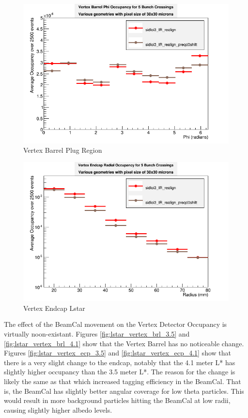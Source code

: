 \documentclass{report}
\begin{document}
                \begin{figure}[H] 
                    \includegraphics[width=\textwidth]{VradOccupancy_Lstar_brl}
                    \centering
                    \caption{Vertex Barrel Plug Region}
                    \label{fig:lstar_vertex_brl}
                \end{figure}
                \begin{figure}[H] 
                    \includegraphics[width=\textwidth]{VradOccupancy_Lstar_ecp}
                    \centering
                    \caption{Vertex Endcap Lstar}
                    \label{fig:lstar_vertex_ecp}
                \end{figure}
                The effect of the BeamCal movement on the Vertex Detector Occupancy is virtually noon-existant. Figures \ref{fig:lstar_vertex_brl_3.5} and \ref{fig:lstar_vertex_brl_4.1} show that the Vertex Barrel has no noticeable change. Figures \ref{fig:lstar_vertex_ecp_3.5} and \ref{fig:lstar_vertex_ecp_4.1} show that there is a very slight change to the endcap, notably that the 4.1 meter L* has slightly higher occupancy than the 3.5 meter L*. The reason for the change is likely the same as that which increased tagging efficiency in the BeamCal. That is, the BeamCal has slightly better angular coverage for low theta particles. This would result in more background particles hitting the BeamCal at low radii, causing slightly higher albedo levels.
\end{document}
